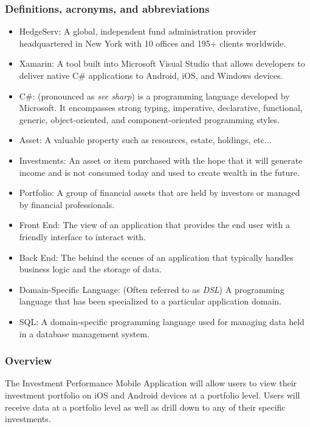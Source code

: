 \documentclass[onecolumn, draftclsnofoot,10pt, compsoc]{IEEEtran}
\begin{document}
\subsubsection{Definitions, acronyms, and abbreviations}
\begin{itemize}
	\item HedgeServ: A global, independent fund administration provider headquartered in New York with
		10 offices and 195+ clients worldwide.
	\item Xamarin: A tool built into Microsoft Visual Studio that allows developers to deliver native 
	   	C\# applications to Android, iOS, and Windows devices.
	\item C\#: (pronounced as \textit{see sharp}) is a programming language developed by Microsoft. It encompasses strong typing, imperative, declarative, functional, generic,
		object-oriented, and component-oriented programming styles.
	\item Asset: A valuable property such as resources, estate, holdings, etc...
	\item Investments: An asset or item purchased with the hope that it will generate income and is not consumed today and used to create wealth in the future.
	\item Portfolio: A group of financial assets that are held by investors or managed by financial professionals.
	\item Front End: The view of an application that provides the end user with a friendly interface to interact with.
	\item Back End: The behind the scenes of an application that typically handles business logic and the storage of data.
	\item Domain-Specific Language: (Often referred to as \textit{DSL}) A programming language that has been specialized to a particular application domain.
	\item SQL: A domain-specific programming language used for managing data held in a database management system.
\end{itemize}

\subsubsection{Overview}

The Investment Performance Mobile Application will allow users to view their investment portfolio on iOS and Android devices at a portfolio level. Users will receive data at a portfolio level as well as drill down to any of their specific investments.
\end{document}

